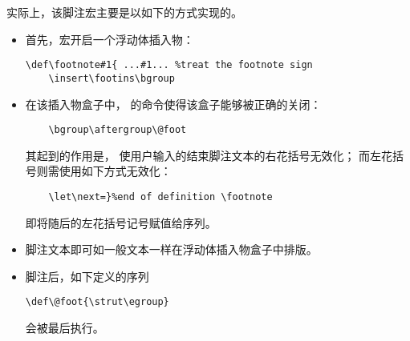 \documentclass{book}
\begin{document}
实际上，该脚注宏主要是以如下的方式实现的。
\begin{itemize}\item 首先，宏开启一个浮动体插入物：
\begin{verbatim}
\def\footnote#1{ ...#1... %treat the footnote sign
    \insert\footins\bgroup
\end{verbatim}
\item 在该插入物盒子中，
的命令使得该盒子能够被正确的关闭：
\begin{verbatim}
    \bgroup\aftergroup\@foot
\end{verbatim}
其起到的作用是，
使用户输入的结束脚注文本的右花括号无效化；
而左花括号则需使用如下方式无效化：
\begin{verbatim}
    \let\next=}%end of definition \footnote
\end{verbatim}
即将随后的左花括号记号赋值给序列。
\item 脚注文本即可如一般文本一样在浮动体插入物盒子中排版。
\item 脚注后，如下定义的序列
\begin{verbatim}
\def\@foot{\strut\egroup}
\end{verbatim}
会被最后执行。
\end{itemize}
\end{document}
